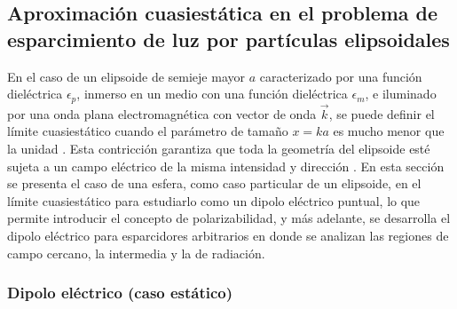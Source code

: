 \hypertarget{primera}{\subsection{Aproximación cuasiestática en el problema de esparcimiento de luz por partículas elipsoidales}}

 En el caso de un elipsoide de semieje mayor $a$ caracterizado por una función dieléctrica $\epsilon_p$, inmerso en un medio con una función dieléctrica $\epsilon_m$, e iluminado por una onda plana electromagnética con vector de onda $\Vec{k}$, se puede definir el límite cuasiestático cuando el parámetro de tamaño $x=ka$ es mucho menor que la unidad \cite{Bohren}. Esta contricción garantiza que toda la geometría del elipsoide esté sujeta a un campo eléctrico de la misma intensidad y dirección \cite{Cuasiestatico}. En esta sección se presenta el caso de una esfera, como caso particular de un elipsoide, en el límite cuasiestático para estudiarlo como un dipolo eléctrico puntual, lo que permite introducir el concepto de polarizabilidad, y más adelante, se desarrolla el dipolo eléctrico para esparcidores arbitrarios en donde se analizan las regiones de campo cercano, la intermedia y la de radiación.


\subsubsection{Dipolo eléctrico (caso estático)}

